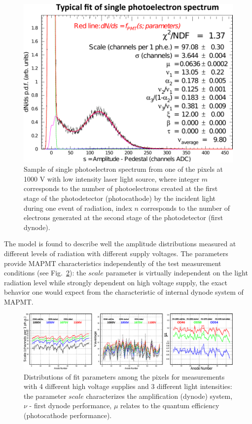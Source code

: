 \begin{figure}[bt]
	\centering
	\includegraphics[width=\linewidth]{figures/SPEfit.pdf}
	\caption{Sample of single photoelectron spectrum from one of the pixels at 1000 V with low intensity laser light source,
where integer $m$ corresponds to the number of photoelectrons created at the first stage of the photodetector (photocathode) by the incident light during one event of radiation, index $n$ corresponds to the number of electrons generated at the second stage of the photodetector (first dynode).
}
\label{fig:SPEfit}
\end{figure}

The model is found to describe well the amplitude distributions measured at different levels of radiation with different supply voltages.
The parameters provide MAPMT characteristics independently of the test measurement conditions (see Fig.~\ref{fig:PavelPassport}): the $scale$ parameter is virtually independent on the light radiation level while strongly dependent on high voltage supply, the exact behavior one would expect from the characteristic of internal dynode system of MAPMT.

\begin{figure}[t]
	\centering
	\includegraphics[width=\linewidth]{figures/PavelPassport.pdf}
	\caption{Distributions of fit parameters among the pixels for measurements with 4 different high voltage supplies and 3 different light intensities: the parameter $scale$ characterizes the amplification (dynode) system, $\nu$ - first dynode performance, $\mu$ relates to the quantum efficiency (photocathode performance).}
	\label{fig:PavelPassport}
\end{figure}

